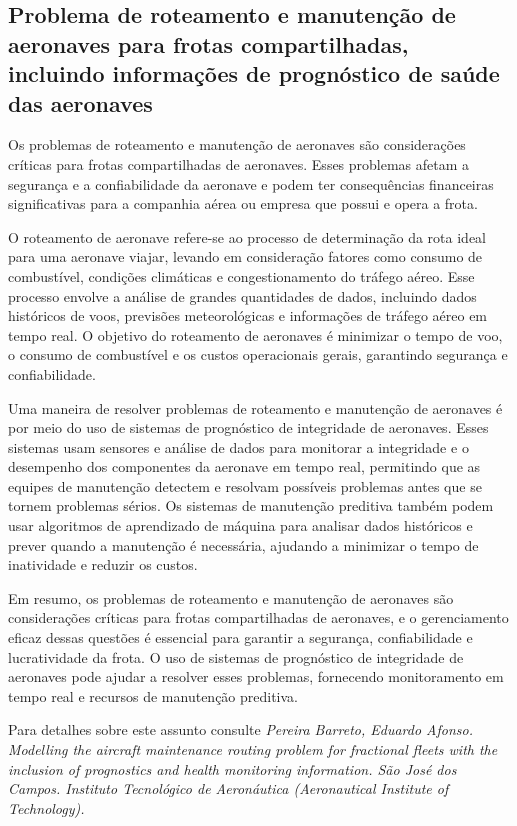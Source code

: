 \documentclass{amsart}
\begin{document}
\subsection{Problema de roteamento e manutenção de aeronaves para frotas compartilhadas, incluindo informações de prognóstico de saúde das aeronaves}

Os problemas de roteamento e manutenção de aeronaves são considerações críticas para frotas compartilhadas de aeronaves. Esses problemas afetam a segurança e a confiabilidade da aeronave e podem ter consequências financeiras significativas para a companhia aérea ou empresa que possui e opera a frota.

O roteamento de aeronave refere-se ao processo de determinação da rota ideal para uma aeronave viajar, levando em consideração fatores como consumo de combustível, condições climáticas e congestionamento do tráfego aéreo. Esse processo envolve a análise de grandes quantidades de dados, incluindo dados históricos de voos, previsões meteorológicas e informações de tráfego aéreo em tempo real. O objetivo do roteamento de aeronaves é minimizar o tempo de voo, o consumo de combustível e os custos operacionais gerais, garantindo segurança e confiabilidade.

Uma maneira de resolver problemas de roteamento e manutenção de aeronaves é por meio do uso de sistemas de prognóstico de integridade de aeronaves. Esses sistemas usam sensores e análise de dados para monitorar a integridade e o desempenho dos componentes da aeronave em tempo real, permitindo que as equipes de manutenção detectem e resolvam possíveis problemas antes que se tornem problemas sérios. Os sistemas de manutenção preditiva também podem usar algoritmos de aprendizado de máquina para analisar dados históricos e prever quando a manutenção é necessária, ajudando a minimizar o tempo de inatividade e reduzir os custos.

Em resumo, os problemas de roteamento e manutenção de aeronaves são considerações críticas para frotas compartilhadas de aeronaves, e o gerenciamento eficaz dessas questões é essencial para garantir a segurança, confiabilidade e lucratividade da frota. O uso de sistemas de prognóstico de integridade de aeronaves pode ajudar a resolver esses problemas, fornecendo monitoramento em tempo real e recursos de manutenção preditiva.

Para detalhes sobre este assunto consulte {\it Pereira Barreto, Eduardo Afonso. Modelling the aircraft maintenance routing problem for fractional fleets with the inclusion of prognostics and health monitoring information. São José dos Campos. Instituto Tecnológico de Aeronáutica (Aeronautical Institute of Technology).}
\end{document}
